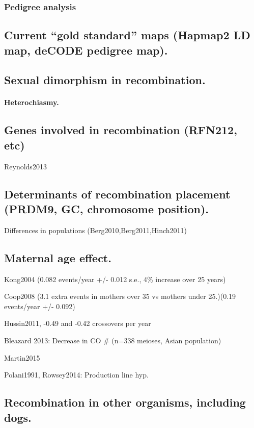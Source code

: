\subsubsection{Pedigree analysis}

\subsection{Current ``gold standard'' maps (Hapmap2 LD map, deCODE pedigree map).}


\subsection{Sexual dimorphism in recombination.}
\paragraph{Heterochiasmy.}


\subsection{Genes involved in recombination (RFN212, etc)}
Reynolds2013

\subsection{Determinants of recombination placement (PRDM9, GC, chromosome position).}

Differences in populations (Berg2010,Berg2011,Hinch2011)

\subsection{Maternal age effect.}

Kong2004 (0.082 events/year +/- 0.012 s.e., 4\% increase over 25 years)

Coop2008 (3.1 extra events in mothers over 35 vs mothers under 25.)(0.19 events/year +/- 0.092)

Hussin2011, -0.49 and -0.42 crossovers per year

Bleazard 2013: Decrease in CO \# (n=338 meioses, Asian population)

Martin2015

Polani1991, Rowsey2014: Production line hyp.

\subsection{Recombination in other organisms, including dogs.}

